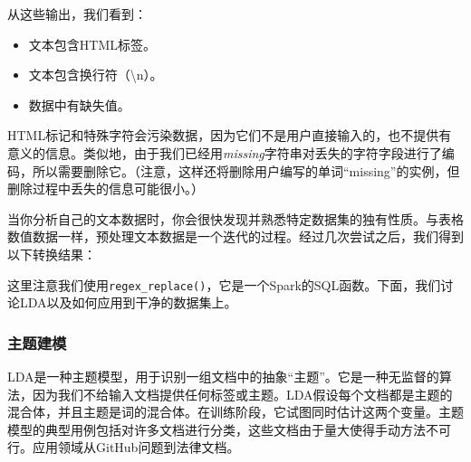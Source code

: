 \documentclass[
]{article}
\newenvironment{Shaded}{\begin{snugshade}}{\end{snugshade}}
\newcommand{\CharTok}[1]{\textcolor[rgb]{0.31,0.60,0.02}{#1}}
\newcommand{\CommentTok}[1]{\textcolor[rgb]{0.56,0.35,0.01}{\textit{#1}}}
\newcommand{\DataTypeTok}[1]{\textcolor[rgb]{0.13,0.29,0.53}{#1}}
\newcommand{\KeywordTok}[1]{\textcolor[rgb]{0.13,0.29,0.53}{\textbf{#1}}}
\newcommand{\NormalTok}[1]{#1}
\newcommand{\OperatorTok}[1]{\textcolor[rgb]{0.81,0.36,0.00}{\textbf{#1}}}
\newcommand{\StringTok}[1]{\textcolor[rgb]{0.31,0.60,0.02}{#1}}
\providecommand{\tightlist}{%
  \setlength{\itemsep}{0pt}\setlength{\parskip}{0pt}}
\begin{document}
从这些输出，我们看到：

\begin{itemize}
\tightlist
\item
  文本包含HTML标签。
\item
  文本包含换行符（\textbackslash n）。
\item
  数据中有缺失值。
\end{itemize}

HTML标记和特殊字符会污染数据，因为它们不是用户直接输入的，也不提供有意义的信息。类似地，由于我们已经用\emph{missing}字符串对丢失的字符字段进行了编码，所以需要删除它。（注意，这样还将删除用户编写的单词``missing''的实例，但删除过程中丢失的信息可能很小。）

当你分析自己的文本数据时，你会很快发现并熟悉特定数据集的独有性质。与表格数值数据一样，预处理文本数据是一个迭代的过程。经过几次尝试之后，我们得到以下转换结果：

\begin{Shaded}
\end{Shaded}

这里注意我们使用\texttt{regex\_replace()}，它是一个Spark的SQL函数。下面，我们讨论LDA以及如何应用到干净的数据集上。

\hypertarget{ux4e3bux9898ux5efaux6a21}{%
\subsubsection{主题建模}\label{ux4e3bux9898ux5efaux6a21}}

LDA是一种主题模型，用于识别一组文档中的抽象``主题''。它是一种无监督的算法，因为我们不给输入文档提供任何标签或主题。LDA假设每个文档都是主题的混合体，并且主题是词的混合体。在训练阶段，它试图同时估计这两个变量。主题模型的典型用例包括对许多文档进行分类，这些文档由于量大使得手动方法不可行。应用领域从GitHub问题到法律文档。
\end{document}
